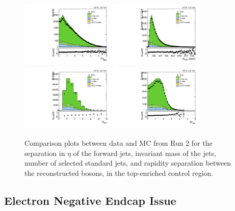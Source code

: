\begin{figure}[htbp]
  \centering
  \includegraphics[width=0.4\textwidth]{fig/controlPlots/CR_b1_allL_allP_allC_allD_Run2_lnujj_vbfDEta.pdf}
  \includegraphics[width=0.4\textwidth]{fig/controlPlots/CR_b1_allL_allP_allC_allD_Run2_lnujj_vbfMass.pdf}\\
  \includegraphics[width=0.4\textwidth]{fig/controlPlots/CR_b1_allL_allP_allC_allD_Run2_lnujj_nJets.pdf}
  \includegraphics[width=0.4\textwidth]{fig/controlPlots/CR_b1_allL_allP_allC_allD_Run2_dy.pdf}\\
  \caption{
    Comparison plots between data and MC from Run 2 for the separation in $\eta$ of the \VBF forward jets, invariant mass of the \VBF jets, number of selected standard jets, and rapidity separation between the reconstructed bosons, in the top-enriched control region.
  }
  \label{fig:CR_controlPlotsRun2_4}
\end{figure}

\subsection{Electron Negative Endcap Issue}

